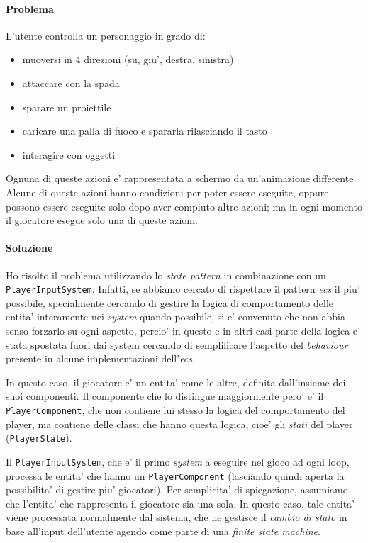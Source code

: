 \documentclass[a4paper,12pt]{report}
\begin{document}
\paragraph{Problema}
L'utente controlla un personaggio in grado di:

\begin{itemize}
	\item muoversi in 4 direzioni (su, giu', destra, sinistra)
	\item attaccare con la spada
	\item sparare un proiettile
	\item caricare una palla di fuoco e spararla rilasciando il tasto
	\item interagire con oggetti
\end{itemize}

Ognuna di queste azioni e' rappresentata a schermo da un'animazione differente. Alcune di queste azioni hanno condizioni per poter essere eseguite, oppure possono essere eseguite solo dopo aver compiuto altre azioni; ma in ogni momento il giocatore esegue solo una di queste azioni.

\paragraph{Soluzione}
Ho risolto il problema utilizzando lo \textit{state pattern} in combinazione con un \texttt{PlayerInputSystem}. Infatti, se abbiamo cercato di rispettare il pattern \textit{ecs} il piu' possibile, specialmente cercando di gestire la logica di comportamento delle entita' interamente nei \textit{system} quando possibile, si e' convenuto che non abbia senso forzarlo su ogni aspetto, percio' in questo e in altri casi parte della logica e' stata spostata fuori dai system cercando di semplificare l'aspetto del \textit{behaviour} presente in alcune implementazioni dell'\textit{ecs}. 

In questo caso, il giocatore e' un entita' come le altre, definita dall'insieme dei suoi componenti. Il componente che lo distingue maggiormente pero' e' il \texttt{PlayerComponent}, che non contiene lui stesso la logica del comportamento del player, ma contiene delle classi che hanno questa logica, cioe' gli \textit{stati} del player (\texttt{PlayerState}). 

Il \texttt{PlayerInputSystem}, che e' il primo \textit{system} a eseguire nel gioco ad ogni loop, processa le entita' che hanno un \texttt{PlayerComponent} (lasciando quindi aperta la possibilita' di gestire piu' giocatori). Per semplicita' di spiegazione, assumiamo che l'entita' che rappresenta il giocatore sia una sola. In questo caso, tale entita' viene processata normalmente dal sistema, che ne gestisce il \textit{cambio di stato} in base all'input dell'utente agendo come parte di una \textit{finite state machine}.
\end{document}
